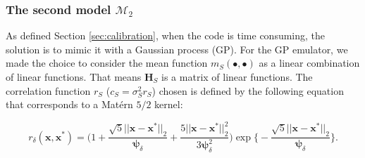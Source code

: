 \documentclass[soumission]{jsfds}
\begin{document}


\subsubsection{The second model $\mathcal{M}_2$}

As defined Section \ref{sec:calibration}, when the code is time consuming, the solution is to mimic it with a Gaussian process (GP). For the GP emulator, we made the choice to consider the mean function $m_S(\bullet,\bullet)$ as a linear combination of linear functions. That means $\textbf{H}_S$ is a matrix of linear functions. The correlation function $r_S$ ($c_S=\sigma_S^2r_S$) chosen is defined by the following equation that corresponds to a Matérn $5/2$ kernel:



\begin{equation}
r_{\delta}(\boldsymbol{x},\boldsymbol{x}^*)= \Big(1+\frac{\sqrt{5}||\boldsymbol{x}-\boldsymbol{x}^*||_2}{\boldsymbol{\psi}_{\delta}}+\frac{5||\boldsymbol{x}-\boldsymbol{x}^*||_2^2}{3\boldsymbol{\psi}_{\delta}^2}\Big)\exp\Big\{-\frac{\sqrt{5}||\boldsymbol{x}-\boldsymbol{x}^*||_2}{\boldsymbol{\psi}_{\delta}}\Big\}.
\label{eq:Matern52Ker}
\end{equation}
\end{document}
